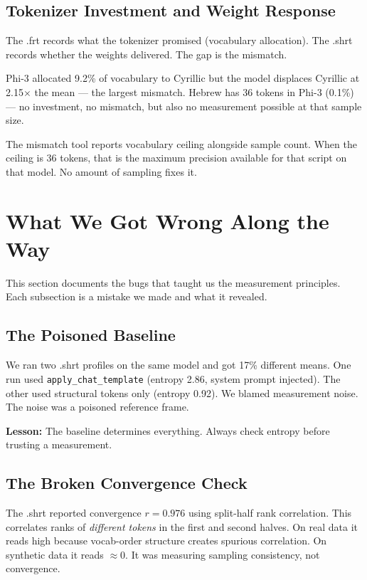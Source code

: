 \documentclass[11pt,a4paper]{article}
\begin{document}
\subsection{Tokenizer Investment and Weight Response}

The .frt records what the tokenizer promised (vocabulary allocation). The .shrt records whether the weights delivered. The gap is the mismatch.

Phi-3 allocated 9.2\% of vocabulary to Cyrillic but the model displaces Cyrillic at 2.15$\times$ the mean --- the largest mismatch. Hebrew has 36 tokens in Phi-3 (0.1\%) --- no investment, no mismatch, but also no measurement possible at that sample size.

The mismatch tool reports vocabulary ceiling alongside sample count. When the ceiling is 36 tokens, that is the maximum precision available for that script on that model. No amount of sampling fixes it.

\section{What We Got Wrong Along the Way}

This section documents the bugs that taught us the measurement principles. Each subsection is a mistake we made and what it revealed.

\subsection{The Poisoned Baseline}

We ran two .shrt profiles on the same model and got 17\% different means. One run used \texttt{apply\_chat\_template} (entropy 2.86, system prompt injected). The other used structural tokens only (entropy 0.92). We blamed measurement noise. The noise was a poisoned reference frame.

\textbf{Lesson:} The baseline determines everything. Always check entropy before trusting a measurement.

\subsection{The Broken Convergence Check}

The .shrt reported convergence $r = 0.976$ using split-half rank correlation. This correlates ranks of \textit{different tokens} in the first and second halves. On real data it reads high because vocab-order structure creates spurious correlation. On synthetic data it reads $\approx 0$. It was measuring sampling consistency, not convergence.
\end{document}
